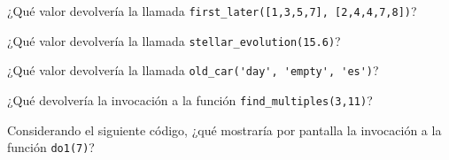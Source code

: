 \documentclass[10pt]{examdesign}
\begin{document}
\begin{multiplechoice}[
title={Preguntas de opción múltiple (5 puntos)}, 
suppressprefix]
  \begin{question}[0.5 pt]
  ¿Qué valor devolvería la llamada \lstinline{first_later([1,3,5,7], [2,4,4,7,8])}?


  \end{question}




  \begin{question}[0.5 pt]
  ¿Qué valor devolvería la llamada \lstinline{stellar_evolution(15.6)}?
  \end{question}


   \begin{question}[0.5 pt]
   ¿Qué valor devolvería la llamada \lstinline{old_car('day', 'empty', 'es')}?
   \end{question}

   
   \begin{question}[0.5 pt]
   ¿Qué devolvería la invocación a la función \lstinline{find_multiples(3,11)}?
   \choice{\lstinline{[3,6,9]}}
   \choice{\lstinline{[0,3,6,9]}}
   \end{question}

   
   \begin{question}[0.5 pt]
    Considerando el siguiente código, ¿qué mostraría por pantalla la invocación a la función \lstinline{do1(7)}?
   \end{question}
	



\end{multiplechoice}
\end{document}
